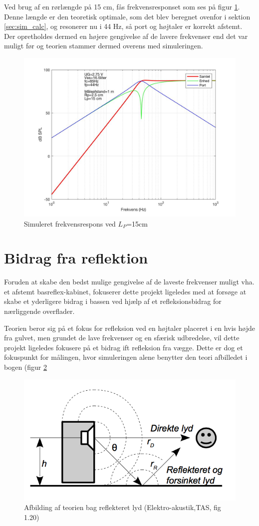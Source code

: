 Ved brug af en rørlængde på 15 cm, fås frekvensresponset som ses på figur \ref{fig:sim_langt}. \\
Denne længde er den teoretisk optimale, som det blev beregnet ovenfor i sektion \ref{sec:sim_calc}, og resonerer nu i 44 Hz, så port og højtaler er korrekt afstemt. 
Der opretholdes dermed en højere gengivelse af de lavere frekvenser end det var muligt før og teorien stammer dermed overens med simuleringen. 

\begin{figure}[h!]
	\centering
	\includegraphics[width=.8\textwidth]{Pics/sim_lang}
	\caption{Simuleret frekvensrespons ved $L_P$=15cm } 
	\label{fig:sim_langt}
\end{figure}


\section{Bidrag fra reflektion}
\label{sec:reflection}
Foruden at skabe den bedst mulige gengivelse af de laveste frekvenser muligt vha. et afstemt basreflex-kabinet, fokuserer dette projekt ligeledes med at forsøge at skabe et yderligere bidrag i bassen ved hjælp af et refleksionsbidrag for nærliggende overflader. 

Teorien beror sig på et fokus for refleksion ved en højtaler placeret i en hvis højde fra gulvet, men grundet de lave frekvenser og en sfærisk udbredelse, vil dette projekt ligeledes fokusere på et bidrag ift refleksion fra vægge. 
Dette er dog et fokuspunkt for målingen, hvor simuleringen alene benytter den teori afbilledet i bogen (figur \ref{fig:reflect}


\begin{figure}[h!]
	\centering
	\includegraphics[width=.7\textwidth]{Pics/reflect}
	\caption{Afbilding af teorien bag reflekteret lyd (Elektro-akustik,TAS, fig 1.20) } 
	\label{fig:reflect}
\end{figure}

